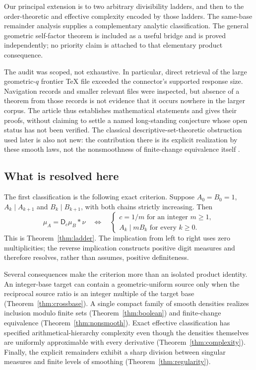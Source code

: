 \documentclass[11pt,a4paper]{article}
\theoremstyle{definition}
\theoremstyle{remark}
\newcommand{\D}{\mathsf D}
\begin{document}
Our principal extension is to two arbitrary divisibility ladders, and then
to the order-theoretic and effective complexity encoded by those ladders.
The same-base remainder analysis supplies a complementary analytic
classification. The general geometric self-factor theorem is included as
a useful bridge and is proved independently; no priority claim is attached
to that elementary product consequence.

The audit was scoped, not exhaustive. In particular, direct retrieval of
the large geometric-$q$ frontier TeX file exceeded the connector's supported
response size. Navigation records and smaller relevant files were inspected,
but absence of a theorem from those records is not evidence that it occurs
nowhere in the larger corpus. The article thus establishes mathematical
statements and gives their proofs, without claiming to settle a named
long-standing conjecture whose open status has not been verified. The
classical descriptive-set-theoretic obstruction used later is also not new:
the contribution there is its explicit realization by these smooth laws,
not the nonsmoothness of finite-change equivalence itself \cite{hkl}.

\subsection{What is resolved here}
The first classification is the following exact criterion. Suppose
$A_0=B_0=1$, $A_k\mid A_{k+1}$ and $B_k\mid B_{k+1}$, with both
chains strictly increasing. Then
\begin{equation}\label{eq:main-preview}
 \mu_A=\D_c\mu_B*\nu
 \quad\Longleftrightarrow\quad
 \left\{\begin{array}{l}
 c=1/m\text{ for an integer }m\ge1,\\
 A_k\mid mB_k\text{ for every }k\ge0.
 \end{array}\right.
\end{equation}
This is Theorem~\ref{thm:ladder}. The implication from left to right uses
zero multiplicities; the reverse implication constructs positive digit
measures and therefore resolves, rather than assumes, positive definiteness.

Several consequences make the criterion more than an isolated product
identity. An integer-base target can contain a geometric-uniform source
only when the reciprocal source ratio is an integer multiple of the target
base (Theorem~\ref{thm:crossbase}). A single compact family of smooth densities
realizes inclusion modulo finite sets (Theorem~\ref{thm:boolean}) and
finite-change equivalence (Theorem~\ref{thm:nonsmooth}). Exact effective
classification has specified arithmetical-hierarchy complexity even though
the densities themselves are uniformly approximable with every derivative
(Theorem~\ref{thm:complexity}). Finally, the explicit remainders exhibit a
sharp division between singular measures and finite levels of smoothing
(Theorem~\ref{thm:regularity}).
\end{document}
